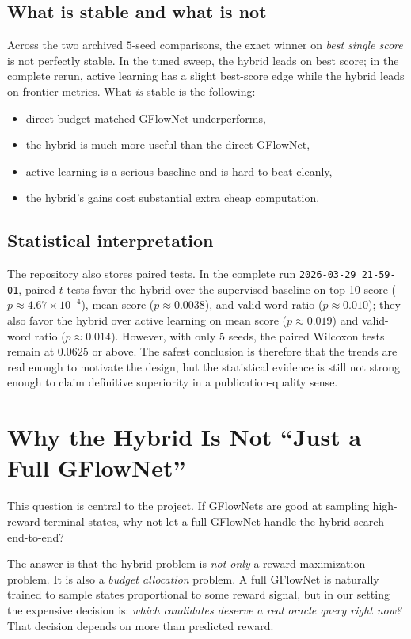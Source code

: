 \documentclass[10pt]{article}
\begin{document}
\subsection{What is stable and what is not}
Across the two archived \(5\)-seed comparisons, the exact winner on \emph{best single score} is not perfectly stable. In the tuned sweep, the hybrid leads on best score; in the complete rerun, active learning has a slight best-score edge while the hybrid leads on frontier metrics. What \emph{is} stable is the following:
\begin{itemize}
    \item direct budget-matched GFlowNet underperforms,
    \item the hybrid is much more useful than the direct GFlowNet,
    \item active learning is a serious baseline and is hard to beat cleanly,
    \item the hybrid's gains cost substantial extra cheap computation.
\end{itemize}

\subsection{Statistical interpretation}
The repository also stores paired tests. In the complete run \texttt{2026-03-29\_21-59-01}, paired \(t\)-tests favor the hybrid over the supervised baseline on top-10 score (\(p \approx 4.67 \times 10^{-4}\)), mean score (\(p \approx 0.0038\)), and valid-word ratio (\(p \approx 0.010\)); they also favor the hybrid over active learning on mean score (\(p \approx 0.019\)) and valid-word ratio (\(p \approx 0.014\)). However, with only \(5\) seeds, the paired Wilcoxon tests remain at \(0.0625\) or above. The safest conclusion is therefore that the trends are real enough to motivate the design, but the statistical evidence is still not strong enough to claim definitive superiority in a publication-quality sense.

\section{Why the Hybrid Is Not ``Just a Full GFlowNet''}
This question is central to the project. If GFlowNets are good at sampling high-reward terminal states, why not let a full GFlowNet handle the hybrid search end-to-end?

The answer is that the hybrid problem is \emph{not only} a reward maximization problem. It is also a \emph{budget allocation} problem. A full GFlowNet is naturally trained to sample states proportional to some reward signal, but in our setting the expensive decision is: \emph{which candidates deserve a real oracle query right now?} That decision depends on more than predicted reward.
\end{document}
